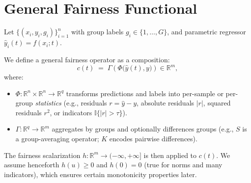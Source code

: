 \documentclass[11pt]{article}
\theoremstyle{plain}
\theoremstyle{definition}
\newcommand{\R}{\mathbb{R}}
\newcommand{\1}{\mathbf{1}}
\newcommand{\ind}{\mathbb{I}}
\begin{document}
\section{General Fairness Functional}
Let $\{(x_i,y_i,g_i)\}_{i=1}^n$ with group labels $g_i\in\{1,\dots,G\}$, and parametric regressor $\hat y_i(t)=f(x_i;t)$.

We define a general fairness operator as a composition:
\[
 c(t) \;=\; \Gamma\!\left( \Phi\big(\hat y(t),y\big) \right) \in \R^m,
\]
where:
\begin{itemize}[leftmargin=2em]
 \item $\Phi:\R^n\times\R^n\to\R^q$ transforms predictions and labels into per-sample or per-group \emph{statistics} (e.g., residuals $r=\hat y-y$, absolute residuals $|r|$, squared residuals $r^2$, or indicators $\ind\{|r|>\tau\}$).
 \item $\Gamma:\R^q\to\R^m$ aggregates by groups and optionally differences groups (e.g., $S$ is a group-averaging operator; $K$ encodes pairwise differences).
\end{itemize}
The fairness scalarization $h:\R^m\to(-\infty,+\infty]$ is then applied to $c(t)$. We assume henceforth $h(u)\ge 0$ and $h(0)=0$ (true for norms and many indicators), which ensures certain monotonicity properties later.
\end{document}
